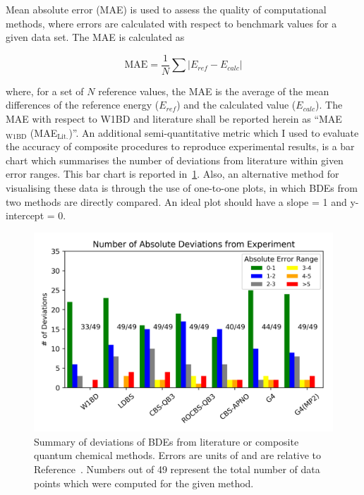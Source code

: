 \begin{landscape}

\end{landscape}

Mean absolute error (MAE) is used to assess the quality of computational methods, where errors are calculated with respect to benchmark values for a given data set.\cite{Savin2014} The MAE is calculated as

\begin{equation}
  \mathrm{MAE} = \frac{1}{N} \sum | E_{ref} - E_{calc}|
\end{equation}

\noindent where, for a set of $N$ reference values, the MAE is the average of the mean differences of the reference energy ($E_{ref}$) and the calculated value ($E_{calc}$). The MAE with respect to W1BD and literature shall be reported herein as ``MAE$_{\mathrm{W1BD}}$ (MAE$_{\mathrm{Lit.}}$)''. An additional semi-quantitative metric which I used to evaluate the accuracy of composite procedures to reproduce experimental results, is a bar chart which summarises the number of deviations from literature within given error ranges. This bar chart is reported in~\ref{fig:maebarchart}. Also, an alternative method for visualising these data is through the use of one-to-one plots, in which BDEs from two methods are directly compared. An ideal plot should have a slope = 1 and y-intercept = 0.

\begin{figure}[H]
  \centering
  \includegraphics[width=\textwidth]{figures/bde-barchart}
  \caption[Summary of deviations of BDEs from literature for composite quantum chemical methods.]{Summary of deviations of BDEs from literature or composite quantum chemical methods. Errors are units of \kcalmol and are relative to Reference~\protect{}. Numbers out of 49 represent the total number of data points which were computed for the given method.}
  \label{fig:maebarchart}
\end{figure}

